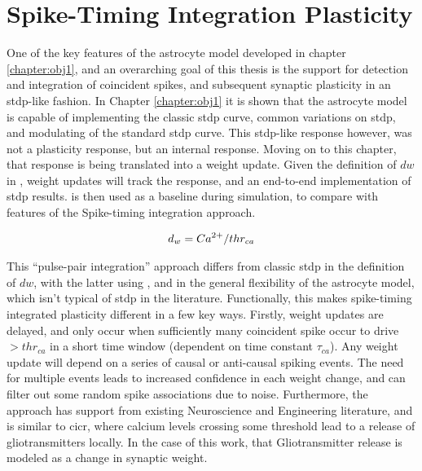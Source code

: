 
\section{Spike-Timing Integration Plasticity}

One of the key features of the astrocyte model developed in chapter
\ref{chapter:obj1}, and an overarching goal of this thesis is the support for
detection and integration of coincident spikes, and subsequent synaptic
plasticity in an \gls{stdp}-like fashion. In Chapter \ref{chapter:obj1} it is shown
that the astrocyte model is capable of
implementing the classic \gls{stdp} curve, common variations on \gls{stdp}, and modulating
of the standard \gls{stdp} curve. This \gls{stdp}-like response however, was not a
plasticity response, but an internal \ca response. Moving on to this chapter,
that \ca response is being translated into a weight update. Given the definition
of $dw$ in , weight updates will track the \ca
response, and an end-to-end implementation of \gls{stdp}
results.  is then used as a baseline during simulation, to
compare with features of the Spike-timing integration approach.

\begin{align}
  d_w = Ca^{2+} / thr_{ca}  \label{eq:dw-classic}
\end{align}

This ``pulse-pair integration'' approach differs from classic \gls{stdp} in the
definition of $dw$, with the latter using , and in the
general flexibility of the astrocyte model, which isn't typical of \gls{stdp} in the
literature. Functionally, this makes spike-timing integrated plasticity different
in a few key ways. Firstly, weight updates are delayed, and
only occur when sufficiently many coincident spike occur to drive \ca
$>thr_{ca}$ in a short time window (dependent on time constant $\tau_{ca}$). Any
weight update will depend on a series of 
causal or anti-causal spiking events. The need for multiple events leads to 
increased confidence in each weight change, and can filter out some random spike
associations due to noise.  Furthermore, the approach has support from existing
Neuroscience and Engineering literature, and is similar to \gls{cicr}, where calcium
levels crossing some threshold lead to a release of gliotransmitters locally. In
the case of this work, that Gliotransmitter release is modeled as a change in
synaptic weight.

